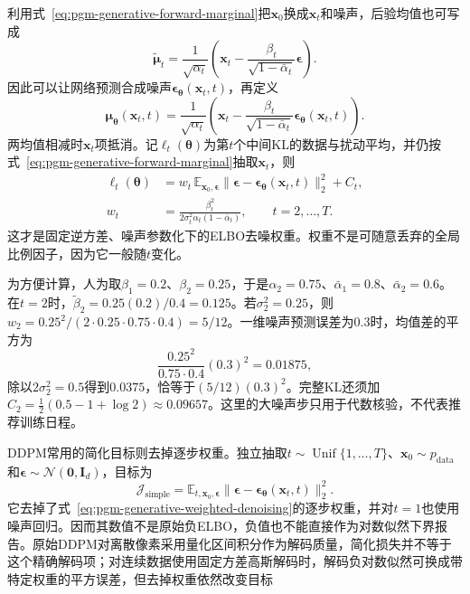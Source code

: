 利用式~\eqref{eq:pgm-generative-forward-marginal}把$\bm{x}_0$换成$\bm{x}_t$和噪声，后验均值也可写成
\[
  \widetilde{\bm{\mu}}_t
  =\frac{1}{\sqrt{\alpha_t}}
       \left(\bm{x}_t-
          \frac{\beta_t}{\sqrt{1-\bar{\alpha}_t}}\bm{\epsilon}\right).
\]
因此可以让网络预测合成噪声$\bm{\epsilon}_{\bm{\theta}}(\bm{x}_t,t)$，再定义
\begin{equation}
  \label{eq:pgm-generative-noise-parameterization}
  \bm{\mu}_{\bm{\theta}}(\bm{x}_t,t)
  =\frac{1}{\sqrt{\alpha_t}}
       \left(\bm{x}_t-
          \frac{\beta_t}{\sqrt{1-\bar{\alpha}_t}}
               \bm{\epsilon}_{\bm{\theta}}(\bm{x}_t,t)\right).
\end{equation}
两均值相减时$\bm{x}_t$项抵消。记$\ell_t(\bm{\theta})$为第$t$个中间KL的数据与扰动平均，并仍按式~\eqref{eq:pgm-generative-forward-marginal}抽取$\bm{x}_t$，则
\begin{equation}
  \label{eq:pgm-generative-weighted-denoising}
  \begin{aligned}
    \ell_t(\bm{\theta})
      &=w_t\,\mathbb{E}_{\bm{x}_0,\bm{\epsilon}}
         \lVert\bm{\epsilon}
          -\bm{\epsilon}_{\bm{\theta}}(\bm{x}_t,t)\rVert_2^2+C_t,\\
    w_t&=\frac{\beta_t^2}
              {2\sigma_t^2\alpha_t(1-\bar{\alpha}_t)},
          \qquad t=2,\ldots,T.
  \end{aligned}
\end{equation}
这才是固定逆方差、噪声参数化下的ELBO去噪权重。权重不是可随意丢弃的全局比例因子，因为它一般随$t$变化。

\begin{example}[核对一个扩散步的权重]
  \label{ex:pgm-generative-step-weight}
  为方便计算，人为取$\beta_1=0.2$、$\beta_2=0.25$，于是$\alpha_2=0.75$、$\bar{\alpha}_1=0.8$、$\bar{\alpha}_2=0.6$。在$t=2$时，$\widetilde{\beta}_2=0.25(0.2)/0.4=0.125$。若$\sigma_2^2=0.25$，则$w_2=0.25^2/(2\cdot0.25\cdot0.75\cdot0.4)=5/12$。一维噪声预测误差为$0.3$时，均值差的平方为
  \[
    \frac{0.25^2}{0.75\cdot0.4}(0.3)^2=0.01875,
  \]
  除以$2\sigma_2^2=0.5$得到$0.0375$，恰等于$(5/12)(0.3)^2$。完整KL还须加$C_2=\tfrac12(0.5-1+\log2)\approx0.09657$。这里的大噪声步只用于代数核验，不代表推荐训练日程。
\end{example}

DDPM常用的简化目标则去掉逐步权重。独立抽取$t\sim\operatorname{Unif}\{1,\ldots,T\}$、$\bm{x}_0\sim p_{\mathrm{data}}$和$\bm{\epsilon}\sim\mathcal{N}(\bm{0},\bm{I}_d)$，目标为
\begin{equation}
  \label{eq:pgm-generative-simple-loss}
  \mathcal{J}_{\mathrm{simple}}
  =\mathbb{E}_{t,\bm{x}_0,\bm{\epsilon}}
      \lVert\bm{\epsilon}
       -\bm{\epsilon}_{\bm{\theta}}(\bm{x}_t,t)\rVert_2^2.
\end{equation}
它去掉了式~\eqref{eq:pgm-generative-weighted-denoising}的逐步权重，并对$t=1$也使用噪声回归。因而其数值不是原始负ELBO，负值也不能直接作为对数似然下界报告。原始DDPM对离散像素采用量化区间积分作为解码质量，简化损失并不等于这个精确解码项；对连续数据使用固定方差高斯解码时，解码负对数似然可换成带特定权重的平方误差，但去掉权重依然改变目标

